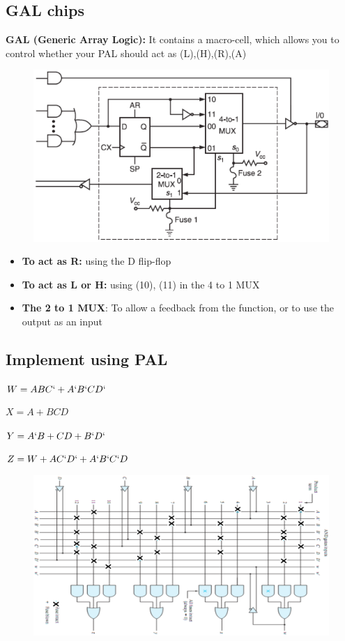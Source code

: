 \documentclass[12 pt]{article}
\begin{document}
\subsection{GAL chips}
\textbf{GAL (Generic Array Logic):} It contains a macro-cell, which allows you to control whether your PAL should act as (L),(H),(R),(A)
\begin{figure}[H]
    \centering
    \includegraphics[scale=0.4]{./images/micro2}
    \label{micro2} 
\end{figure}
\begin{itemize}
    \item \textbf{To act as R:} using the D flip-flop
    \item \textbf{To act as L or H:} using (10), (11) in the 4 to 1 MUX
    \item \textbf{The 2 to 1 MUX}: To allow a feedback from the function, or to use the output as an input
\end{itemize}
\subsection{Implement using PAL}

$W=ABC`+A`B`CD`$

$X = A + B C D$

$Y = A` B +C D + B` D`$

$Z = W + A C` D` +A` B` C` D$
\begin{figure}[H]
    \centering
    \includegraphics[scale=0.35]{./images/micro3}
    \label{micro3} 
\end{figure}
\end{document}
